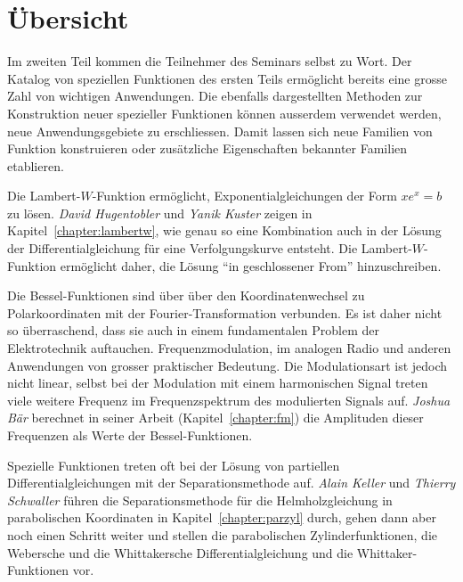 %
%
%
\chapter*{Übersicht}
\rhead{}
\label{buch:uebersicht}
Im zweiten Teil kommen die Teilnehmer des Seminars selbst zu Wort.
Der Katalog von speziellen Funktionen des ersten Teils ermöglicht
bereits eine grosse Zahl von wichtigen Anwendungen.
Die ebenfalls dargestellten Methoden zur Konstruktion neuer spezieller
Funktionen können ausserdem verwendet werden, neue Anwendungsgebiete
zu erschliessen.
Damit lassen sich neue Familien von Funktion konstruieren oder 
zusätzliche Eigenschaften bekannter Familien etablieren.

Die Lambert-$W$-Funktion ermöglicht, Exponentialgleichungen der
Form $xe^x=b$ zu lösen.
{\em David Hugentobler}
%
%
und
{\em Yanik Kuster}
%
%
zeigen in Kapitel~\ref{chapter:lambertw}, wie genau so eine Kombination
auch in der Lösung der Differentialgleichung für eine Verfolgungskurve
entsteht.
Die Lambert-$W$-Funktion ermöglicht daher, die Lösung ``in geschlossener
From'' hinzuschreiben.

Die Bessel-Funktionen sind über über den Koordinatenwechsel zu
Polarkoordinaten mit der Fourier-Transformation verbunden.
Es ist daher nicht so überraschend, dass sie auch in einem 
fundamentalen Problem der Elektrotechnik auftauchen.
Frequenzmodulation, im analogen Radio und anderen Anwendungen
von grosser praktischer Bedeutung.
Die Modulationsart ist jedoch nicht linear, selbst bei der Modulation
mit einem harmonischen Signal treten viele weitere Frequenz im 
Frequenzspektrum des modulierten Signals auf.
{\em Joshua Bär}
%
%
berechnet in seiner Arbeit (Kapitel~\ref{chapter:fm}) die Amplituden
dieser Frequenzen als Werte der Bessel-Funktionen.

Spezielle Funktionen treten oft bei der Lösung von
partiellen Differentialgleichungen mit der Separationsmethode auf.
{\em Alain Keller} 
%
%
und
{\em Thierry Schwaller}
%
%
führen die Separationsmethode für die Helmholzgleichung in parabolischen
Koordinaten in Kapitel~\ref{chapter:parzyl}
durch, gehen dann aber noch einen Schritt weiter und 
stellen die parabolischen Zylinderfunktionen,
die Webersche und die Whittakersche Differentialgleichung und die
Whittaker-Funktionen vor.

